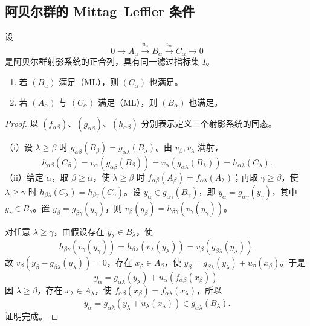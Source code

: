 \subsection{阿贝尔群的 Mittag--Leffler 条件}
设
\[
0\longrightarrow A_\alpha\xrightarrow{u_\alpha}B_\alpha
\xrightarrow{v_\alpha}C_\alpha\longrightarrow0
\]
是阿贝尔群射影系统的正合列，具有同一滤过指标集 $I$。
\begin{enumerate}[label=(\roman*)]
\item 若 $(B_\alpha)$ 满足（ML），则 $(C_\alpha)$ 也满足。
\item 若 $(A_\alpha)$ 与 $(C_\alpha)$ 满足（ML），则 $(B_\alpha)$ 也满足。
\end{enumerate}
\begin{proof}
以 $(f_{\alpha\beta})$、$(g_{\alpha\beta})$、$(h_{\alpha\beta})$ 分别表示定义三个射影系统的同态。

（i）设 $\lambda\geq\beta$ 时 $g_{\alpha\beta}(B_\beta)=g_{\alpha\lambda}(B_\lambda)$。由 $v_\beta,v_\lambda$ 满射，
\[
h_{\alpha\beta}(C_\beta)
=v_\alpha(g_{\alpha\beta}(B_\beta))
=v_\alpha(g_{\alpha\lambda}(B_\lambda))
=h_{\alpha\lambda}(C_\lambda).
\]
（ii）给定 $\alpha$，取 $\beta\geq\alpha$，使 $\lambda\geq\beta$ 时 $f_{\alpha\beta}(A_\beta)=f_{\alpha\lambda}(A_\lambda)$；再取 $\gamma\geq\beta$，使 $\lambda\geq\gamma$ 时 $h_{\beta\lambda}(C_\lambda)=h_{\beta\gamma}(C_\gamma)$。设 $y_\alpha\in g_{\alpha\gamma}(B_\gamma)$，即 $y_\alpha=g_{\alpha\gamma}(y_\gamma)$，其中 $y_\gamma\in B_\gamma$。置 $y_\beta=g_{\beta\gamma}(y_\gamma)$，则 $v_\beta(y_\beta)=h_{\beta\gamma}(v_\gamma(y_\gamma))$。

对任意 $\lambda\geq\gamma$，由假设存在 $y_\lambda\in B_\lambda$，使
\[
h_{\beta\gamma}(v_\gamma(y_\gamma))
=h_{\beta\lambda}(v_\lambda(y_\lambda))
=v_\beta(g_{\beta\lambda}(y_\lambda)).
\]
故 $v_\beta(y_\beta-g_{\beta\lambda}(y_\lambda))=0$，存在 $x_\beta\in A_\beta$，使 $y_\beta=g_{\beta\lambda}(y_\lambda)+u_\beta(x_\beta)$。于是
\[
y_\alpha=g_{\alpha\lambda}(y_\lambda)+u_\alpha(f_{\alpha\beta}(x_\beta)).
\]
因 $\lambda\geq\beta$，存在 $x_\lambda\in A_\lambda$，使 $f_{\alpha\beta}(x_\beta)=f_{\alpha\lambda}(x_\lambda)$，所以
\[
y_\alpha=g_{\alpha\lambda}(y_\lambda+u_\lambda(x_\lambda))
\in g_{\alpha\lambda}(B_\lambda).
\]
证明完成。
\end{proof}

